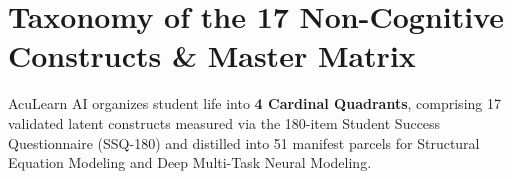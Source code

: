 \documentclass[10pt,a4paper]{article}
\begin{document}
\vspace{0.3cm}
\tableofcontents
\newpage

\section{Taxonomy of the 17 Non-Cognitive Constructs \& Master Matrix}

AcuLearn AI organizes student life into \textbf{4 Cardinal Quadrants}, comprising 17 validated latent constructs measured via the 180-item Student Success Questionnaire (SSQ-180) and distilled into 51 manifest parcels for Structural Equation Modeling and Deep Multi-Task Neural Modeling.
\end{document}
